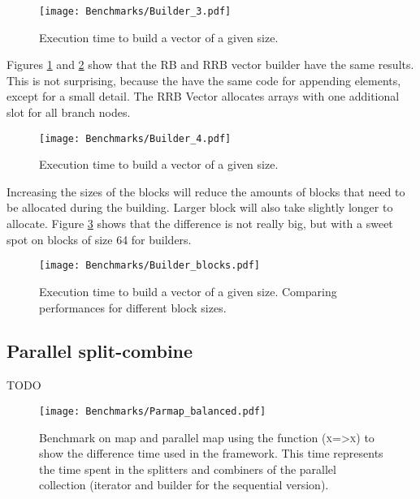 
\begin{figure}[h!]
  \centering
  \texttt{[image: Benchmarks/Builder\_3.pdf]}
  \caption{Execution time to build a vector of a given size.}
    \label{Builder3Benchmarks}
\end{figure}

Figures \ref{Builder3Benchmarks} and \ref{Builder4Benchmarks} show that the RB and RRB vector builder have the same results. This is not surprising, because the have the same code for appending elements, except for a small detail. The RRB Vector allocates arrays with one additional slot for all branch nodes.

\begin{figure}[h!]
  \centering
  \texttt{[image: Benchmarks/Builder\_4.pdf]}
  \caption{Execution time to build a vector of a given size.}
   \label{Builder4Benchmarks}
\end{figure}

\FloatBarrier

Increasing the sizes of the blocks will reduce the amounts of blocks that need to be allocated during the building. Larger block will also take slightly longer to allocate. Figure \ref{BuilderBlocksBenchmarks} shows that the difference is not really big, but with a sweet spot on blocks of size 64 for builders.

\begin{figure}[h!]
  \centering
  \texttt{[image: Benchmarks/Builder\_blocks.pdf]}
  \caption{Execution time to build a vector of a given size. Comparing performances for different block sizes.}
  \label{BuilderBlocksBenchmarks}
\end{figure}

\FloatBarrier

\subsection{Parallel split-combine}
\color{red} TODO \color{black}

\begin{figure}[h!]
  \centering
  \texttt{[image: Benchmarks/Parmap\_balanced.pdf]}
  \label{ParallelBenchmarks}
  \caption{Benchmark on map and parallel map using the function (\textsc{x=>x}) to show the difference time used in the framework. This time represents the time spent in the splitters and combiners of the parallel collection (iterator and builder for the sequential version).}
\end{figure}

